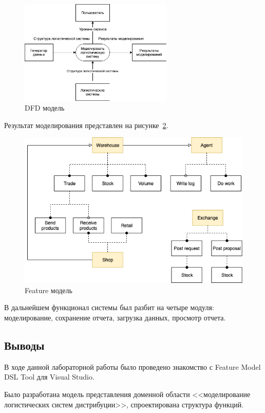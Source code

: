 \begin{figure}[H]
    \centering
    \includegraphics[width=0.65\textwidth]{dfd}
    \caption{DFD модель}
    \label{fig:dfd}
\end{figure}

Результат моделирования представлен на рисунке~\ref{fig:dsl}. 

\begin{figure}[H]
    \centering
    \includegraphics[width=0.8registrationSource\textwidth]{dsl}
    \caption{Feature модель}
    \label{fig:dsl}
\end{figure}

В дальнейшем функционал системы был разбит на четыре модуля: моделирование, сохранение отчета, загрузка данных, просмотр отчета.

\subsection*{Выводы}
В ходе данной лабораторной работы было проведено знакомство с Feature Model DSL Tool для Visual Studio.

Было разработана модель представления доменной области <<моделирование логистических систем дистрибуции>>, спроектирована структура функций. 



